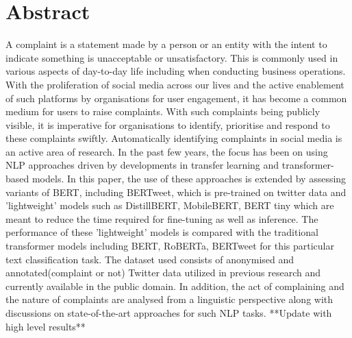 \chapter*{\Large \center Abstract}

A complaint is a statement made by a person or an entity with the intent to indicate something is unacceptable or unsatisfactory. This is commonly used in various aspects of day-to-day life including when conducting business operations. With the proliferation of social media across our lives and the active enablement of such platforms by organisations for user engagement, it has become a common medium for users to raise complaints. With such complaints being publicly visible, it is imperative for organisations to identify, prioritise and respond to these complaints swiftly. Automatically identifying complaints in social media is an active area of research. In the past few years, the focus has been on using NLP approaches driven by developments in transfer learning and transformer-based models.
\newline \newline
In this paper, the use of these approaches is extended by assessing variants of BERT, including BERTweet, which is pre-trained on twitter data and 'lightweight' models such as DistillBERT, MobileBERT, BERT tiny which are meant to reduce the time required for fine-tuning as well as inference. The performance of these 'lightweight' models is compared with the traditional transformer models including BERT, RoBERTa, BERTweet for this particular text classification task. The dataset used consists of anonymised and annotated(complaint or not) Twitter data utilized in previous research and currently available in the public domain. In addition, the act of complaining and the nature of complaints are analysed from a linguistic perspective along with discussions on state-of-the-art approaches for such NLP tasks.
\newline \newline
**Update with high level results**